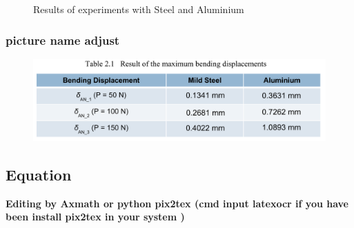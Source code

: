 \begin{figure}[htp]
	\centering
	\caption{Results of experiments with Steel and Aluminium} %
	\label{F 1.1}
\end{figure}

\subsubsection{picture name adjust}
\begin{figure}[H]
	\centering
	\includegraphics[width=1.0\linewidth]{"Example/figures/result"}
	\caption*{}
	\label{T 2.1}
\end{figure}
\newpage

\subsection{Equation}
\textbf{Editing by Axmath or python pix2tex (cmd input latexocr if you have been install pix2tex in your system )}

